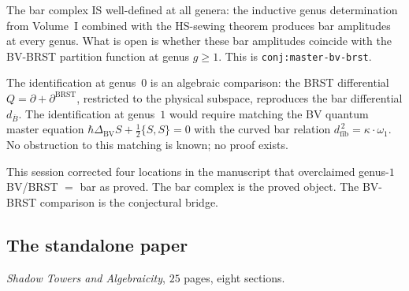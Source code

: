 \documentclass[11pt]{article}
\newcommand{\barB}{\overline{B}}
\newcommand{\dfib}{d_{\mathrm{fib}}}
\begin{document}
\medskip

The bar complex IS well-defined at all genera: the inductive
genus determination from Volume~I combined with the HS-sewing
theorem produces bar amplitudes at every genus.  What is open
is whether these bar amplitudes coincide with the BV-BRST
partition function at genus $g \geq 1$.  This is
\texttt{conj:master-bv-brst}.

The identification at genus~$0$ is an algebraic comparison:
the BRST differential $Q = \partial + \partial^{\mathrm{BRST}}$,
restricted to the physical subspace, reproduces the bar
differential $d_{\barB}$.  The identification at genus~$1$
would require matching the BV quantum master equation
$\hbar\Delta_{\mathrm{BV}}S + \tfrac{1}{2}\{S, S\} = 0$ with
the curved bar relation $\dfib^{\,2} = \kappa \cdot \omega_1$.
No obstruction to this matching is known; no proof exists.

This session corrected four locations in the manuscript that
overclaimed genus-$1$ BV/BRST $=$ bar as proved.  The bar
complex is the proved object.  The BV-BRST comparison is the
conjectural bridge.


\subsection{The standalone paper}
\label{sec:standalone-paper}

\textit{Shadow Towers and Algebraicity}, $25$ pages, eight
sections.
\end{document}
